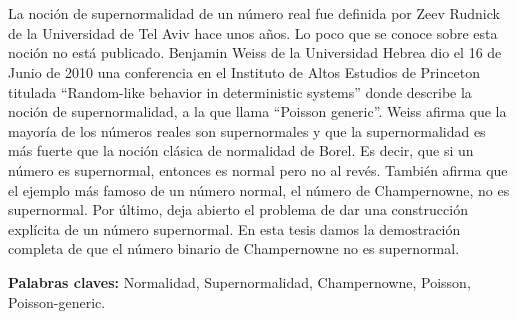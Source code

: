 \chapter*{\runtitulo}

La noción de supernormalidad de un número real fue definida por Zeev Rudnick de la Universidad de Tel Aviv hace unos años. 
Lo poco que se conoce sobre esta noción no está publicado. Benjamin Weiss de la Universidad Hebrea dio el 16 de Junio de 2010 una conferencia en el Instituto de Altos Estudios de Princeton titulada “Random-like behavior in deterministic systems” donde describe la noción de supernormalidad, a la que llama “Poisson generic”. 
Weiss afirma que la mayoría de los números reales son supernormales y que la supernormalidad es más fuerte que la noción clásica de normalidad de Borel.
 Es decir, que si un número es supernormal, entonces es normal pero no al revés.
  También afirma que el ejemplo más famoso de un número normal, el número de Champernowne, no es supernormal. 
  Por último, deja abierto el problema de dar una construcción explícita de un número supernormal.
   En esta tesis damos la demostración completa de que el número binario de Champernowne no es supernormal.

\bigskip

\noindent\textbf{Palabras claves:} Normalidad, Supernormalidad, Champernowne, Poisson, Poisson-generic.